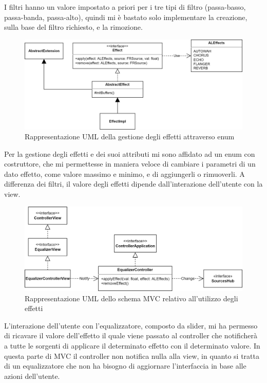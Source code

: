 \documentclass[a4paper,12pt]{report}
\begin{document}
I filtri hanno un valore impostato a priori per i tre tipi di filtro (passa-basso, passa-banda, passa-alto), quindi mi è bastato solo implementare la creazione, sulla base del filtro richiesto, e la rimozione. 
%
\begin{figure}[H]
\centering{}
\includegraphics[width=\textwidth]{img/extension/Effect.png}
\caption{Rappresentazione UML della gestione degli effetti attraverso enum}
\label{img:effects}
\end{figure}
Per la gestione degli effetti e dei suoi attributi mi sono affidato ad un enum con costruttore, che mi permettesse in maniera veloce di cambiare i parametri di un dato effetto, come valore massimo e minimo, e di aggiungerli o rimuoverli. A differenza dei filtri, il valore degli effetti dipende dall’interazione dell’utente con la view.
%
\begin{figure}[H]
\centering{}
\includegraphics[width=\textwidth]{img/extension/EffectsMVC.png}
\caption{Rappresentazione UML dello schema MVC relativo all’utilizzo degli effetti}
\label{img:effectsmvc}
\end{figure}
L’interazione dell’utente con l’equalizzatore, composto da slider, mi ha permesso di ricavare il valore dell’effetto il quale viene passato al controller che notificherà a tutte le sorgenti di applicare il determinato effetto con il determinato valore. In questa parte di MVC il controller non notifica nulla alla view, in quanto si tratta di un equalizzatore che non ha bisogno di aggiornare l’interfaccia in base alle azioni dell’utente.
%
\end{document}
